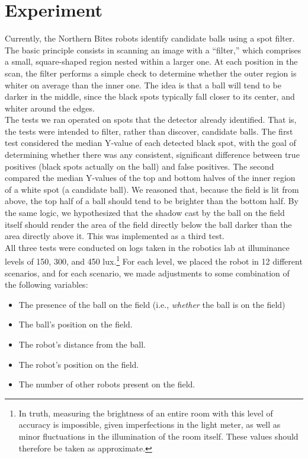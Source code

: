 \documentclass[11pt, twocolumn]{article}
\begin{document}
{\section{Experiment}
Currently, the Northern Bites robots identify candidate balls using a spot filter. The basic principle consists in scanning an image with a ``filter,'' which comprises a small, square-shaped region nested within a larger one. At each position in the scan, the filter performs a simple check to determine whether the outer region is whiter on average than the inner one. The idea is that a ball will tend to be darker in the middle, since the black spots typically fall closer to its center, and whiter around the edges. \\
\indent The tests we ran operated on spots that the detector already identified. That is, the tests were intended to filter, rather than discover, candidate balls. The first test considered the median Y-value of each detected black spot, with the goal of determining whether there was any consistent, significant difference between true positives (black spots actually on the ball) and false positives. The second compared the median Y-values of the top and bottom halves of the inner region of a white spot (a candidate ball). We reasoned that, because the field is lit from above, the top half of a ball should tend to be brighter than the bottom half. By the same logic, we hypothesized that the shadow cast by the ball on the field itself should render the area of the field directly below the ball darker than the area directly above it. This was implemented as a third test. \\
\indent All three tests were conducted on logs taken in the robotics lab at illuminance levels of 150, 300, and 450 lux.\footnote{In truth, measuring the brightness of an entire room with this level of accuracy is impossible, given imperfections in the light meter, as well as minor fluctuations in the illumination of the room itself. These values should therefore be taken as approximate.} For each level, we placed the robot in 12 different scenarios, and for each scenario, we made adjustments to some combination of the following variables:
\begin{itemize}
\item The presence of the ball on the field (i.e., \emph{whether} the ball is on the field)
\item The ball's position on the field.
\item The robot's distance from the ball.
\item The robot's position on the field.
\item The number of other robots present on the field.
\end{itemize}
}
\end{document}
